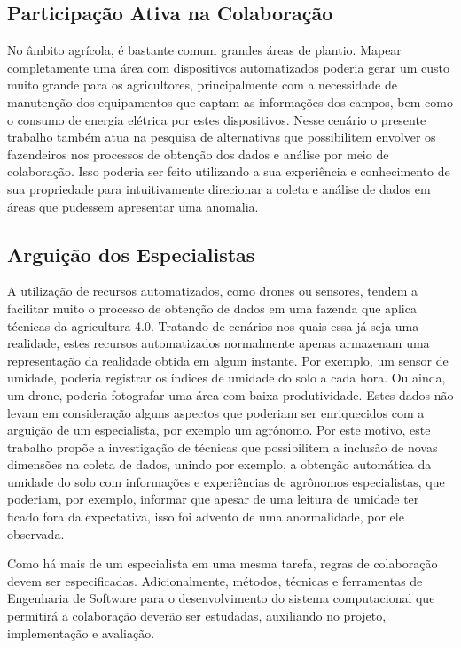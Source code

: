 \documentclass[12pt]{article}
\begin{document}
\subsection{Participação Ativa na Colaboração}
\label{subsec:participacao_ativa_colaboracao}

No âmbito agrícola, é bastante comum grandes áreas de plantio. Mapear completamente uma área com dispositivos automatizados poderia gerar um custo muito grande para os agricultores, principalmente com a necessidade de manutenção dos equipamentos que captam as informações dos campos, bem como o consumo de energia elétrica por estes dispositivos. Nesse cenário o presente trabalho também atua na pesquisa de alternativas que possibilitem envolver os fazendeiros nos processos de obtenção dos dados e análise por meio de colaboração. Isso poderia ser feito utilizando a sua experiência e conhecimento de sua propriedade para intuitivamente direcionar a coleta e análise de dados em áreas que pudessem apresentar uma anomalia.

\subsection{Arguição dos Especialistas}
\label{subsec:arquicao_especialistas}

A utilização de recursos automatizados, como drones ou sensores, tendem a facilitar muito o processo de obtenção de dados em uma fazenda que aplica técnicas da agricultura 4.0. Tratando de cenários nos quais essa já seja uma realidade, estes recursos automatizados normalmente apenas armazenam uma representação da realidade obtida em algum instante. Por exemplo, um sensor de umidade, poderia registrar os índices de umidade do solo a cada hora. Ou ainda, um drone, poderia fotografar uma área com baixa produtividade. Estes dados não levam em consideração alguns aspectos que poderiam ser enriquecidos com a arguição de um especialista, por exemplo um agrônomo. Por este motivo, este trabalho propõe a investigação de técnicas que possibilitem a inclusão de novas dimensões na coleta de dados, unindo por exemplo, a obtenção automática da umidade do solo com informações e experiências de agrônomos especialistas, que poderiam, por exemplo, informar que apesar de uma leitura de umidade ter ficado fora da expectativa, isso foi advento de uma anormalidade, por ele observada. 

Como há mais de um especialista em uma mesma tarefa, regras de colaboração devem ser especificadas. Adicionalmente, métodos, técnicas e ferramentas de Engenharia de Software para o desenvolvimento do sistema computacional que permitirá a colaboração deverão ser estudadas, auxiliando no projeto, implementação e avaliação.
\end{document}
